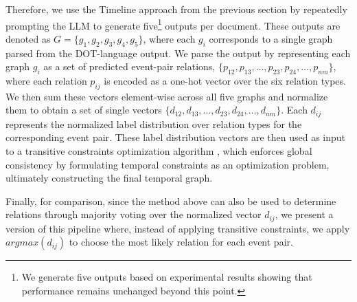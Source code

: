 Therefore, we use the Timeline approach from the previous section by repeatedly prompting the LLM to generate five\footnote{We generate five outputs based on experimental results showing that performance remains unchanged beyond this point.} outputs per document. These outputs are denoted as \( G = \{g_1, g_2, g_3, g_4, g_5\} \), where each \( g_i \) corresponds to a single graph parsed from the DOT-language output. We parse the output by representing each graph \( g_i \) as a set of predicted event-pair relations, \( \{p_{12}, p_{13}, \dots, p_{23}, p_{24}, \dots, p_{nm}\} \), where each relation \( p_{ij} \) is encoded as a one-hot vector over the six relation types. We then sum these vectors element-wise across all five graphs and normalize them to obtain a set of single vectors \( \{d_{12}, d_{13}, \dots, d_{23}, d_{24}, \dots, d_{nm}\} \). Each \( d_{ij} \) represents the normalized label distribution over relation types for the corresponding event pair. These label distribution vectors are then used as input to a transitive constraints optimization algorithm \cite{ning-etal-2018-joint}, which enforces global consistency by formulating temporal constraints as an optimization problem, ultimately constructing the final temporal graph.


Finally, for comparison, since the method above can also be used to determine relations through majority voting over the normalized vector $d_{ij}$, we present a version of this pipeline where, instead of applying transitive constraints, we apply $argmax(d_{ij})$ to choose the most likely relation for each event pair.

% 

% 

